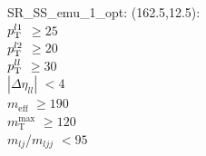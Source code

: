 SR\_SS\_emu\_1\_opt: (162.5,12.5): \\
$p_{\text{T}}^{l1}$ $\geq 25$ \\
$p_{\text{T}}^{l2}$ $\geq 20$ \\
$p_{\text{T}}^{ll}$ $\geq 30$ \\
$|\Delta\eta_{ll}|$ $<4$ \\
$m_{\text{eff}}$ $\geq 190$ \\
$m_{\text{T}}^{\text{max}}$ $\geq 120$ \\
$m_{lj}$/$m_{ljj}$ $<95$ \\
